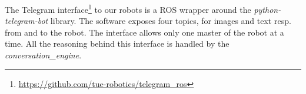 \label{ssec:telegram}
The Telegram interface\footnote{\url{https://github.com/tue-robotics/telegram_ros}} to our robots is a ROS wrapper around the \emph{python-telegram-bot} library. The software exposes four topics, for images and text resp. from and to the robot. The interface allows only one master of the robot at a time. All the reasoning behind this interface is handled by the \emph{conversation\_engine}.
